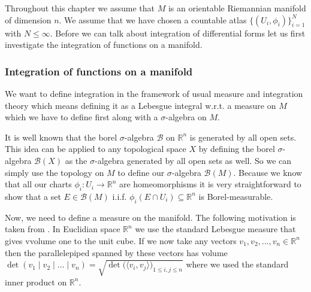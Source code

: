 \documentclass[12pt,a4paper]{article}
\numberwithin{equation}{subsection}
\numberwithin{lemma}{subsection}
\theoremstyle{definition}
\newcommand{\real}{\mathbb{R}}
\begin{document}
Throughout this chapter we assume that $M$ is an orientable Riemannian 
manifold of dimension $n$. We assume that we have chosen a 
countable atlas $\{ (U_i, \phi_i) \}_{i=1}^N$ with $N \leq \infty$. 
Before we can talk about integration of differential forms let us first 
investigate the integration of functions on a manifold.

\subsubsection{Integration of functions on a manifold}

We want to define integration in the framework of usual measure and integration
theory which means defining it as a Lebesgue integral w.r.t. a measure on $M$
which we have to define first along with a $\sigma$-algebra on $M$. 

It is well known that
the borel $\sigma$-algebra $\mathcal{B}$ on $\real^n$ is generated
by all open sets. This idea can be applied to any topological space $X$ by 
defining the borel $\sigma$-algebra $\mathcal{B}(X)$ as the $\sigma$-algebra 
generated by all open sets as well. So we can simply use the topology on $M$ to define 
our $\sigma$-algebra $\mathcal{B}(M)$. Because we know that all our 
charts $\phi_i: U_i \rightarrow \real^n$ are homeomorphisms it is very 
straightforward to show that a set $E \in \mathcal{B}(M)$ i.i.f.
$\phi_i(E \cap U_i) \subseteq \real^n$ is Borel-measurable. 

Now, we need to define a measure on the manifold. 
The following motivation is taken from \cite[3.H.2]{gallot_hulin_lafontaine}.
In Euclidian space $\real^n$ we use the standard Lebesgue measure that gives 
vvolume one to the unit cube. If we now take any vectors $v_1, v_2, ..., v_n 
\in \real^n$ then the parallelepiped spanned by these vectors has 
volume $\det (v_1 \mid v_2 \mid \dots \mid v_n) 
= \sqrt{ \det \big( \langle v_i , v_j \rangle \big)_{1\leq i,j \leq n} }$ where 
we used the standard inner product on $\real^n$. 
\end{document}
